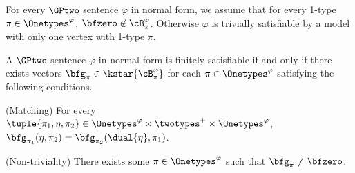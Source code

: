 For every $\GPtwo$ sentence $\varphi$ in normal form,
we assume that
for every 1-type $\pi \in \Onetypes^\varphi$,
$\bfzero \not\in \cB^{\varphi}_{\pi}$.
Otherwise $\varphi$ is trivially satisfiable
by a model with only one vertex with 1-type $\pi$. 

\begin{lemma}\label{lem:equiv1}
    A $\GPtwo$ sentence $\varphi$ in normal form is finitely satisfiable
    if and only if there exists vectors $\bfg_\pi \in \kstar{\cB^\varphi_\pi}$ for each $\pi \in \Onetypes^\varphi$ satisfying the following conditions. 
    \begin{compactitem}
        \item (Matching) For every $\tuple{\pi_1, \eta, \pi_2} \in \Onetypes^\varphi \times \twotypes^+ \times \Onetypes^\varphi$,
        $\bfg_{\pi_1}(\eta, \pi_2) = \bfg_{\pi_2}(\dual{\eta}, \pi_1)$.

        \item (Non-triviality) There exists some $\pi \in \Onetypes^\varphi$ such that $\bfg_\pi \neq \bfzero$.
    \end{compactitem}
\end{lemma}


